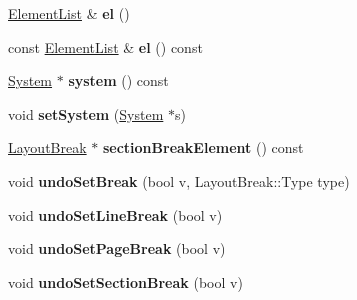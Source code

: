 \begin{DoxyCompactItemize}
\item 
\mbox{\label{class_ms_1_1_measure_base_ab0832f1270b77762f3c12758fe22c3c2}} 
\hyperlink{class_ms_1_1_element_list}{Element\+List} \& {\bfseries el} ()
\item 
\mbox{\label{class_ms_1_1_measure_base_a5ff4dfd4e22172c779b0eaeb8ba6b4ba}} 
const \hyperlink{class_ms_1_1_element_list}{Element\+List} \& {\bfseries el} () const
\item 
\mbox{\label{class_ms_1_1_measure_base_a0e9a0473e5ed4cc38a1dead12bf4c2f3}} 
\hyperlink{class_ms_1_1_system}{System} $\ast$ {\bfseries system} () const
\item 
\mbox{\label{class_ms_1_1_measure_base_a650e991868e0532ab8f5cfa4e8c7d86e}} 
void {\bfseries set\+System} (\hyperlink{class_ms_1_1_system}{System} $\ast$s)
\item 
\mbox{\label{class_ms_1_1_measure_base_ab63433e71da0f897674777d96da8fa0d}} 
\hyperlink{class_ms_1_1_layout_break}{Layout\+Break} $\ast$ {\bfseries section\+Break\+Element} () const
\item 
\mbox{\label{class_ms_1_1_measure_base_a8b631dda96b341c3212ef8200ad10288}} 
void {\bfseries undo\+Set\+Break} (bool v, Layout\+Break\+::\+Type type)
\item 
\mbox{\label{class_ms_1_1_measure_base_a1ee0fe79be0935b6137e13172427679b}} 
void {\bfseries undo\+Set\+Line\+Break} (bool v)
\item 
\mbox{\label{class_ms_1_1_measure_base_a23c20cdb53c0282ff7f92f1f0ed53cdb}} 
void {\bfseries undo\+Set\+Page\+Break} (bool v)
\item 
\mbox{\label{class_ms_1_1_measure_base_a19a7663d2d327655b46fde35769784ab}} 
void {\bfseries undo\+Set\+Section\+Break} (bool v)
\item 
\mbox{\label{class_ms_1_1_measure_base_a578dfa21aa8c0b779a161b150b3e7e33}} 

\end{DoxyCompactItemize}
